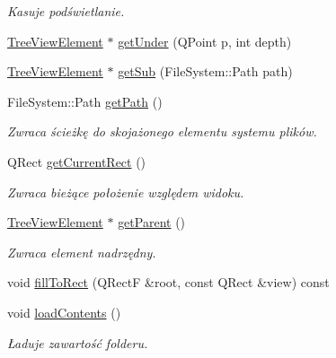 \begin{DoxyCompactItemize}
\begin{DoxyCompactList}\small\item\em Kasuje podświetlanie. \item\end{DoxyCompactList}\item 
\hyperlink{class_tree_view_element}{TreeViewElement} $\ast$ \hyperlink{class_tree_view_element_acb6765cd0b22b6a0373003861fbee380}{getUnder} (QPoint p, int depth)
\item 
\hyperlink{class_tree_view_element}{TreeViewElement} $\ast$ \hyperlink{class_tree_view_element_a660573381cd4c76ba7c8ff91df904beb}{getSub} (FileSystem::Path path)
\item 
\hypertarget{class_tree_view_element_a6993a9dd942db72aa8bc5c0c8286ad95}{
FileSystem::Path \hyperlink{class_tree_view_element_a6993a9dd942db72aa8bc5c0c8286ad95}{getPath} ()}
\label{class_tree_view_element_a6993a9dd942db72aa8bc5c0c8286ad95}

\begin{DoxyCompactList}\small\item\em Zwraca ścieżkę do skojażonego elementu systemu plików. \item\end{DoxyCompactList}\item 
\hypertarget{class_tree_view_element_af4719f3d6eb6966b12cc559aad24d150}{
QRect \hyperlink{class_tree_view_element_af4719f3d6eb6966b12cc559aad24d150}{getCurrentRect} ()}
\label{class_tree_view_element_af4719f3d6eb6966b12cc559aad24d150}

\begin{DoxyCompactList}\small\item\em Zwraca bieżące położenie względem widoku. \item\end{DoxyCompactList}\item 
\hypertarget{class_tree_view_element_ae4d3cc1c8305d138b722134a0be75945}{
\hyperlink{class_tree_view_element}{TreeViewElement} $\ast$ \hyperlink{class_tree_view_element_ae4d3cc1c8305d138b722134a0be75945}{getParent} ()}
\label{class_tree_view_element_ae4d3cc1c8305d138b722134a0be75945}

\begin{DoxyCompactList}\small\item\em Zwraca element nadrzędny. \item\end{DoxyCompactList}\item 
void \hyperlink{class_tree_view_element_aa4b02b8bdf1c2f300c379badfaa46eb2}{fillToRect} (QRectF \&root, const QRect \&view) const 
\item 
\hypertarget{class_tree_view_element_aa7b3e02f2ddc30b21b823a526c54649c}{
void \hyperlink{class_tree_view_element_aa7b3e02f2ddc30b21b823a526c54649c}{loadContents} ()}
\label{class_tree_view_element_aa7b3e02f2ddc30b21b823a526c54649c}

\begin{DoxyCompactList}\small\item\em Ładuje zawartość folderu. \item\end{DoxyCompactList}\end{DoxyCompactItemize}
